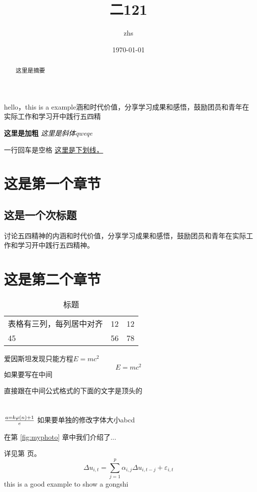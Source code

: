 \documentclass[UTF8]{ctexart}
\title{二121}
\author{zhs}
\date{\today}
\begin{document}
\maketitle

\begin{abstract}
	这里是摘要
\end{abstract}

hello，this is a example涵和时代价值，分享学习成果和感悟，鼓励团员和青年在实际工作和学习开中践行五四精

\textbf{这里是加粗}
\textit{这里是斜体qweqe}

一行回车是空格
\underline{这里是下划线，}

\section{这是第一个章节}


\subsection{这是一个次标题}


讨论五四精神的内涵和时代价值，分享学习成果和感悟，鼓励团员和青年在实际工作和学习开中践行五四精神。
\section{这是第二个章节}

\begin{table}[htbp]
\center
	\begin{tabular}
		{p{3cm} c| c}
		\hline\hline
		表格有三列，每列居中对齐&12&12\\
		45&56&78\\	
	\end{tabular}
		\caption{标题}
\end{table}

爱因斯坦发现只能方程$E=mc^2$
\[
E=mc^2 
\]如果要写在中间


直接跟在中间公式格式的下面的文字是顶头的


\section{}
$a={k\varphi(n)+1}\over e$
{如果要单独的修改字体大小\fontsize{20}{12}\selectfont abcd}

在第 \ref{fig:myphoto} 章中我们介绍了...

详见第 \pageref{fig:myphoto} 页。
\begin{equation}
	\Delta u_{i,t} = \sum_{j=1}^{p} \alpha_{i,j} \Delta u_{i,t-j} + \varepsilon_{i,t}  \tag{2.1} 
\end{equation}
this is a good example to show a gongshi 
\end{document}
